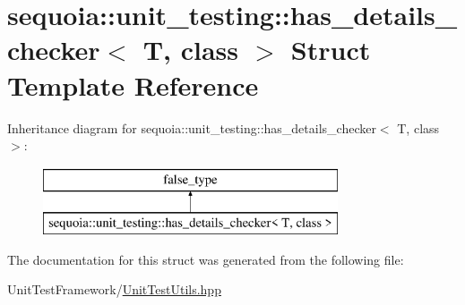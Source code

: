 \hypertarget{structsequoia_1_1unit__testing_1_1has__details__checker}{}\section{sequoia\+::unit\+\_\+testing\+::has\+\_\+details\+\_\+checker$<$ T, class $>$ Struct Template Reference}
\label{structsequoia_1_1unit__testing_1_1has__details__checker}
Inheritance diagram for sequoia\+::unit\+\_\+testing\+::has\+\_\+details\+\_\+checker$<$ T, class $>$\+:\begin{figure}[H]
\begin{center}
\leavevmode
\includegraphics[height=2.000000cm]{structsequoia_1_1unit__testing_1_1has__details__checker}
\end{center}
\end{figure}


The documentation for this struct was generated from the following file\+:\begin{DoxyCompactItemize}
\item 
Unit\+Test\+Framework/\mbox{\hyperlink{_unit_test_utils_8hpp}{Unit\+Test\+Utils.\+hpp}}\end{DoxyCompactItemize}
